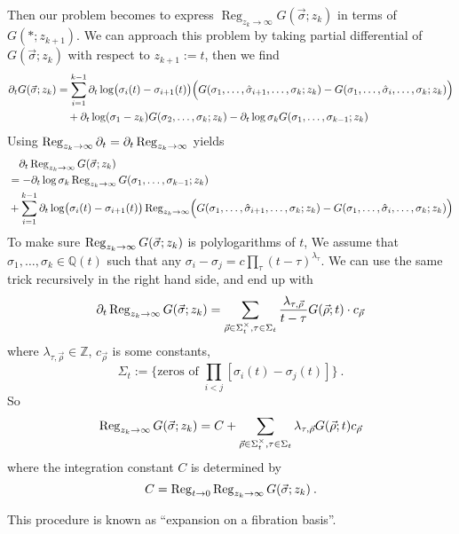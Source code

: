 \documentclass[12pt]{article}
\begin{document}
Then our problem becomes to express $\operatorname{Reg}_{z_{k}\to\infty} G(\vec{\sigma};z_{k})$ in terms of $G(\ast;z_{k+1})$. We can approach this problem by taking partial differential of $G(\vec{\sigma};z_{k})$ with respect to $z_{k+1}:=t$, then we find 
\begin{align}
    \partial_{t} G(\vec{\sigma};z_{k})&=\sum_{i=1}^{k-1} \partial_{t}\log\bigl(\sigma_{i}(t)-\sigma_{i+1}(t)\bigr)
    \Bigl(G(\sigma_{1},\ldots,\hat{\sigma}_{i+1},\ldots ,\sigma_{k};z_{k})-G(\sigma_{1},\ldots,\hat{\sigma}_{i},\ldots ,\sigma_{k};z_{k})\Bigr) \nonumber \\
    &\quad +\partial_{t}\log(\sigma_{1}-z_{k})G(\sigma_{2},\ldots,\sigma_{k};z_{k})-
    \partial_{t}\log\sigma_{k}G(\sigma_{1},\ldots,\sigma_{k-1};z_{k})
\end{align}
Using $\operatorname{Reg}_{z_{k}\to\infty}\partial_{t}=\partial_{t}\operatorname{Reg}_{z_{k}\to\infty}$ yields
\begin{align}
    &\quad \partial_{t}\operatorname{Reg}_{z_{k}\to\infty}G(\vec{\sigma};z_{k}) \nonumber \\
    &=-\partial_{t}\log\sigma_{k} \operatorname{Reg}_{z_{k}\to\infty} G(\sigma_{1},\ldots,\sigma_{k-1};z_{k})  \nonumber \\
    &+\sum_{i=1}^{k-1} \partial_{t}\log\bigl(\sigma_{i}(t)-\sigma_{i+1}(t)\bigr) \operatorname{Reg}_{z_{k}\to\infty}
    \Bigl(G(\sigma_{1},\ldots,\hat{\sigma}_{i+1},\ldots ,\sigma_{k};z_{k})-G(\sigma_{1},\ldots,\hat{\sigma}_{i},\ldots ,\sigma_{k};z_{k})\Bigr)
\end{align}
To make sure $\operatorname{Reg}_{z_{k}\to\infty}G(\vec{\sigma};z_{k})$ is  polylogarithms of $t$,  We assume that $\sigma_{1},\ldots,\sigma_{k}\in \mathbb{Q}(t)$ such that any $\sigma_{i}-\sigma_{j}=c\prod_{\tau}(t-\tau)^{\lambda_{\tau}}$. We can use the same trick recursively in the right hand side, and end up with 
\begin{equation}
    \partial_{t}\operatorname{Reg}_{z_{k}\to\infty} G(\vec{\sigma};z_{k}) = \sum_{\vec{\rho}\in\Sigma_{t}^{\times},\tau\in\Sigma_{t}}
    \frac{\lambda_{\tau,\vec{\rho}}}{t-\tau}G(\vec{\rho};t)\cdot c_{\vec{\rho}}
\end{equation} 
where $\lambda_{\tau,\vec{\rho}}\in \mathbb{Z}$, $c_{\vec{\rho}}$ is some constants,
\begin{equation}
    \Sigma_{t}:= \Biggl\{\text{zeros of }\prod_{i<j}[\sigma_{i}(t)-\sigma_{j}(t)]\Biggr\} \:.
\end{equation} 
So
\begin{equation}
    \operatorname{Reg}_{z_{k}\to\infty} G(\vec{\sigma};z_{k}) = C +\sum_{\vec{\rho}\in\Sigma_{t}^{\times},\tau\in\Sigma_{t}}
    \lambda_{\tau,\vec{\rho}}G(\vec{\rho};t)c_{\vec{\rho}}
\end{equation}
where the integration constant $C$ is determined by 
\begin{equation}
    C=\operatorname{Reg}_{t\to 0}\operatorname{Reg}_{z_{k}\to\infty} G(\vec{\sigma};z_{k}) \:.
\end{equation}

This procedure is known as ``expansion on a fibration basis''.



\end{document}
